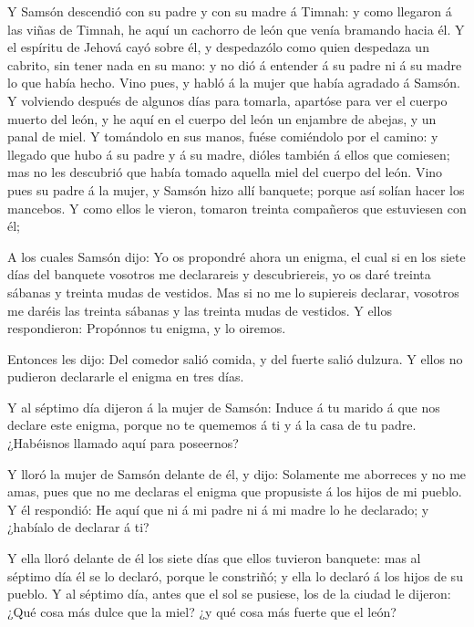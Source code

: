  Y Samsón descendió con su padre y con su madre á Timnah: y
como llegaron á las viñas de Timnah, he aquí un cachorro de león que
venía bramando hacia él.  Y el espíritu de Jehová cayó sobre
él, y despedazólo como quien despedaza un cabrito, sin tener nada en su
mano: y no dió á entender á su padre ni á su madre lo que había hecho.
 Vino pues, y habló á la mujer que había agradado á Samsón.
 Y volviendo después de algunos días para tomarla, apartóse
para ver el cuerpo muerto del león, y he aquí en el cuerpo del león un
enjambre de abejas, y un panal de miel.  Y tomándolo en sus
manos, fuése comiéndolo por el camino: y llegado que hubo á su padre y á
su madre, dióles también á ellos que comiesen; mas no les descubrió que
había tomado aquella miel del cuerpo del león.  Vino pues
su padre á la mujer, y Samsón hizo allí banquete; porque así solían
hacer los mancebos.  Y como ellos le vieron, tomaron
treinta compañeros que estuviesen con él;

 A los cuales Samsón dijo: Yo os propondré ahora un enigma,
el cual si en los siete días del banquete vosotros me declarareis y
descubriereis, yo os daré treinta sábanas y treinta mudas de vestidos.
 Mas si no me lo supiereis declarar, vosotros me daréis las
treinta sábanas y las treinta mudas de vestidos. Y ellos respondieron:
Propónnos tu enigma, y lo oiremos.

 Entonces les dijo: Del comedor salió comida, y del fuerte
salió dulzura. Y ellos no pudieron declararle el enigma en tres días.

 Y al séptimo día dijeron á la mujer de Samsón: Induce á tu
marido á que nos declare este enigma, porque no te quememos á ti y á la
casa de tu padre. ¿Habéisnos llamado aquí para poseernos?

 Y lloró la mujer de Samsón delante de él, y dijo:
Solamente me aborreces y no me amas, pues que no me declaras el enigma
que propusiste á los hijos de mi pueblo. Y él respondió: He aquí que ni
á mi padre ni á mi madre lo he declarado; y ¿habíalo de declarar á ti?

 Y ella lloró delante de él los siete días que ellos
tuvieron banquete: mas al séptimo día él se lo declaró, porque le
constriñó; y ella lo declaró á los hijos de su pueblo.  Y
al séptimo día, antes que el sol se pusiese, los de la ciudad le
dijeron: ¿Qué cosa más dulce que la miel? ¿y qué cosa más fuerte que el
león?

